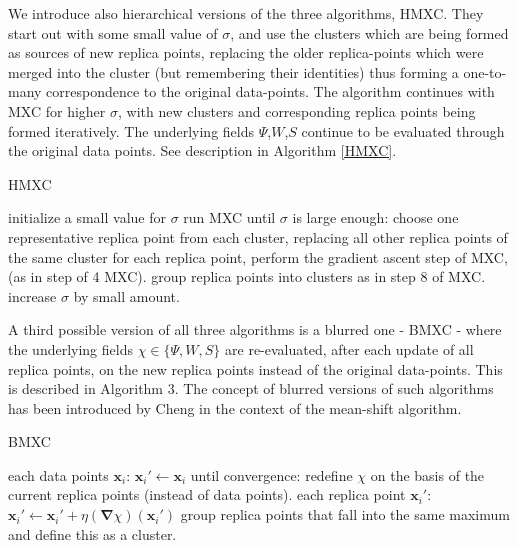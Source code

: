 \documentclass[preprint,12pt]{elsarticle}
\begin{document}
We introduce also hierarchical versions of the three algorithms, HMXC. They start out with some small value of $\sigma$, and use the clusters which are being formed as sources of new replica points, replacing the older replica-points which were merged into the cluster (but remembering their identities) thus forming a one-to-many correspondence to the original data-points. The algorithm continues with MXC for higher $\sigma$, with new clusters and corresponding replica points being formed iteratively. The underlying fields  $\Psi$,$W$,$S$ continue to be evaluated through the original data points. See description in Algorithm \ref{HMXC}.

\begin{algorithm}
\caption{HMXC}\label{HMXC}
\begin{algorithmic}[1]
\State initialize a small value for $\sigma$
\State run MXC
\MRepeat until $\sigma$ is large enough:
	\State choose one representative replica point from each cluster, replacing all other replica points of the same cluster
	\State for each replica point, perform the gradient ascent step of MXC, (as in step of 4 MXC).
	\State group replica points into clusters as in step 8 of MXC.
	\State increase $\sigma$ by small amount.
\EndMRepeat
\end{algorithmic}
\end{algorithm}

A third possible version of all three algorithms is a blurred one - BMXC - where the underlying fields $\chi \in \{\Psi,W,S\}$ are re-evaluated, after each update of all replica points, on the new replica points instead of the original data-points. This is described in Algorithm 3. The concept of blurred versions of such algorithms has been introduced by Cheng \cite{cheng1995} in the context of the mean-shift algorithm.

\begin{algorithm}
\caption{BMXC}\label{BMXC}
\begin{algorithmic}[1]
\MFor each data points $\mathbf{x}_i$:
	\State $\mathbf{x}_i' \gets \mathbf{x}_i$
\EndMFor
\MRepeat until convergence:
	\State redefine $\chi$ on the basis of the current replica points (instead of data points).
	\MFor each replica point $\mathbf{x}_i'$:
		\State $\mathbf{x}_i' \gets \mathbf{x}_i'+\eta\left(\boldsymbol{\nabla}\chi\right)\left(\mathbf{x}_i'\right)$
	\EndMFor
\EndMRepeat
\State group replica points that fall into the same maximum and define this as a cluster.
\end{algorithmic}
\end{algorithm}
\end{document}
